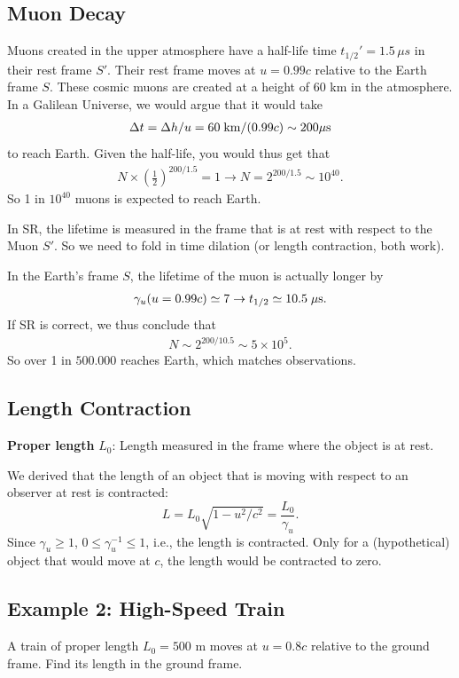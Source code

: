 \documentclass[12pt]{article}
\newcommand{\be}{\begin{eqnarray}}
\newcommand{\ee}{\end{eqnarray}}
\begin{document}
\subsection{Muon Decay}
Muons created in the upper atmosphere have a half-life time $t_{1/2}' = 1.5\,\mu s$ in their rest frame $S'$. Their rest frame moves at $u = 0.99c$ relative to the Earth frame $S$. These cosmic muons are created at a height of $60$ km in the atmosphere. In a Galilean Universe, we would argue that it would take
\be
\Delta t = \Delta h / u = 60\;{\rm km}/ (0.99 c) \sim 200 \mu{\rm s}
\ee
to reach Earth. Given the half-life, you would thus get that
\be
N \times \left(\frac{1}{2}\right)^{200/1.5} = 1 \rightarrow N = 2^{200/1.5} \sim 10^{40}.
\ee
So 1 in $10^{40}$ muons is expected to reach Earth.

In SR, the lifetime is measured in the frame that is at rest with respect to the Muon $S'$. So we need to fold in time dilation (or length contraction, both work).

In the Earth's frame $S$, the lifetime of the muon is actually longer by
\be
\gamma_u(u = 0.99c) \simeq 7 \rightarrow t_{1/2} \simeq 10.5\;\mu{\rm s}.
\ee
If SR is correct, we thus conclude that
\be
N \sim 2^{200/10.5} \sim 5\times 10^5.
\ee
So over 1 in $500.000$ reaches Earth, which matches observations.


\subsection{Length Contraction}
\textbf{Proper length} $L_0$: Length measured in the frame where the object is at rest.

We derived that the length of an object that is moving with respect to an observer at rest is contracted:
\begin{equation}
L = L_0 \sqrt{1 - u^2/c^2} = \frac{L_0}{\gamma_u}.
\end{equation}
Since $\gamma_u \geq 1$, $0\leq \gamma_u^{-1}\leq 1$, i.e., the length is contracted. Only for a (hypothetical) object that would move at $c$, the length would be contracted to zero.

\subsection*{Example 2: High-Speed Train}
A train of proper length $L_0 = 500$ m moves at $u = 0.8c$ relative to the ground frame. Find its length in the ground frame.
\end{document}

